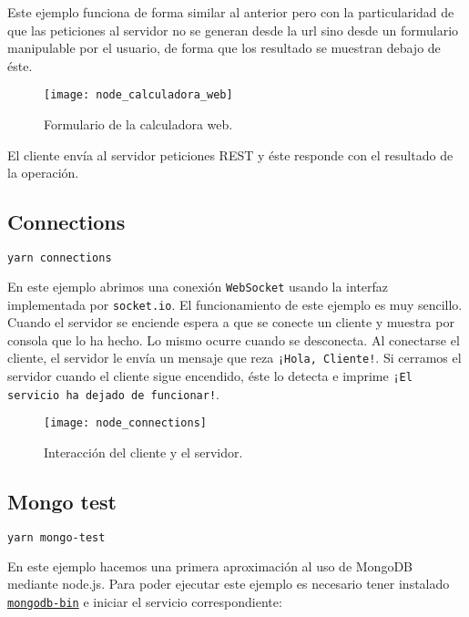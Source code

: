 Este ejemplo funciona de forma similar al anterior pero con la particularidad de que las peticiones al servidor no se generan desde la url sino desde un formulario manipulable por el usuario, de forma que los resultado se muestran debajo de éste.

\begin{figure}[!ht]
\begin{center}
	\texttt{[image: node\_calculadora\_web]}
\end{center}
\caption{Formulario de la calculadora web.}
\end{figure}

El cliente envía al servidor peticiones REST y éste responde con el resultado de la operación.

\subsection{Connections}

\begin{lstlisting}[language=sh]
yarn connections
\end{lstlisting}

En este ejemplo abrimos una conexión \texttt{WebSocket} usando la interfaz implementada por \texttt{socket.io}.
El funcionamiento de este ejemplo es muy sencillo.
Cuando el servidor se enciende espera a que se conecte un cliente y muestra por consola que lo ha hecho.
Lo mismo ocurre cuando se desconecta.
Al conectarse el cliente, el servidor le envía un mensaje que reza \texttt{¡Hola, Cliente!}.
Si cerramos el servidor cuando el cliente sigue encendido, éste lo detecta e imprime \texttt{¡El servicio ha dejado de funcionar!}.

\begin{figure}[!ht]
\begin{center}
	\texttt{[image: node\_connections]}
\end{center}
\caption{Interacción del cliente y el servidor.}
\end{figure}

\subsection{Mongo test}

\begin{lstlisting}[language=sh]
yarn mongo-test
\end{lstlisting}

En este ejemplo hacemos una primera aproximación al uso de MongoDB mediante node.js.
Para poder ejecutar este ejemplo es necesario tener instalado \href{https://aur.archlinux.org/packages/mongodb-bin/}{\texttt{mongodb-bin}} e iniciar el servicio correspondiente:

